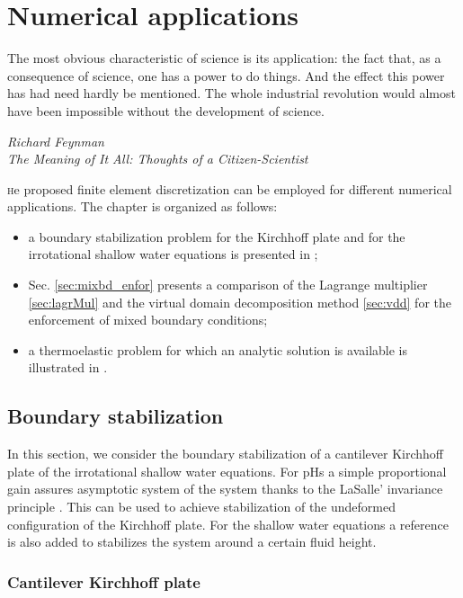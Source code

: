 \chapter{Numerical applications}\label{ch:applications}

\epigraph{The most obvious characteristic of science is its application: the fact that, as a consequence of science, one has a power to do things. And the effect this power has had need hardly be mentioned. The whole industrial revolution would almost have been impossible without the development of science.}{\textit{Richard Feynman \\ The Meaning of It All: Thoughts of a Citizen-Scientist}}
\minitoc

\lettrine{\color{theme}{T}}he proposed finite element discretization can be employed for different numerical applications. The chapter is organized as follows:
\begin{itemize}
	\item a boundary stabilization problem for the Kirchhoff plate and for the irrotational shallow water equations is presented in ;
	\item Sec. \ref{sec:mixbd_enfor} presents a comparison of the Lagrange multiplier \ref{sec:lagrMul} and the virtual domain decomposition method \ref{sec:vdd} for the enforcement of mixed boundary conditions;
	\item a thermoelastic problem for which an analytic solution is available is illustrated in .
\end{itemize}



\section{Boundary stabilization}\label{sec:bd_stab}

In this section, we consider the boundary stabilization of a cantilever Kirchhoff plate of the irrotational shallow water equations. For pHs a simple proportional gain assures asymptotic system of the system thanks to the LaSalle’ invariance principle \cite[Proposition 6.2]{duindam2009}. This can be used to achieve stabilization of the undeformed configuration of the Kirchhoff plate. For the shallow water equations a reference is also added to stabilizes the system around a certain fluid height.


\subsection{Cantilever Kirchhoff plate}\label{sec:bd_stabKP}

